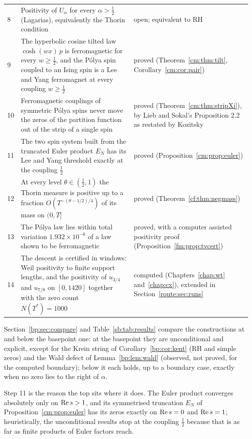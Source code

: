 \begin{longtable}{p{}p{}p{}}
8 & Positivity of $U_\alpha$ for every $\alpha>\frac12$ (Lagarias), equivalently the Thorin condition & open; equivalent to RH\\
9 & The hyperbolic cosine tilted law $\cosh(wx)\,p$ is ferromagnetic for every $w\ge\frac12$, and the P\'olya spin coupled to an Ising spin is a Lee and Yang ferromagnet at every coupling $w\ge\frac12$ & proved (Theorem~\ref{cm:thm:tilt}, Corollary~\ref{cm:cor:pair})\\
10 & Ferromagnetic couplings of symmetric P\'olya spins never move the zeros of the partition function out of the strip of a single spin & proved (Theorem~\ref{cm:thm:stripXi}), by Lieb and Sokal's Proposition 2.2 as restated by Kozitsky\\
11 & The two spin system built from the truncated Euler product $E_N$ has its Lee and Yang threshold exactly at the coupling $\frac12$ & proved (Proposition~\ref{cm:prop:euler})\\
12 & At every level $\theta\in(\frac12,1)$ the Thorin measure is positive up to a fraction $O(T^{-(\theta-1/2)/4})$ of its mass on $(0,T]$ & proved (Theorem~\ref{cf:thm:negmass})\\
13 & The P\'olya law lies within total variation $1.932\times10^{-6}$ of a law shown to be ferromagnetic & proved, with a computer assisted positivity proof (Proposition~\ref{fm:prop:tvcert})\\
14 & The descent is certified in windows: Weil positivity to finite support lengths, and the positivity of $u_{3/4}$ and $u_{7/8}$ on $[0,1420]$ together with the zero count $N(T^*)=1000$ & computed (Chapters~\ref{chap:wt} and~\ref{chap:cx}), extended in Section~\ref{route:sec:runs}\\
\bottomrule
\end{longtable}

Section~\ref{bp:sec:compare} and Table~\ref{sb:tab:results} compare the constructions at and below the basepoint one: at the basepoint they are unconditional and explicit, except for the Krein string of Corollary~\ref{bp:cor:kent} (RH and simple zeros) and the Wald defect of Lemma~\ref{bp:lem:wald} (observed, not proved, for the computed boundary); below it each holds, up to a boundary case, exactly when no zero lies to the right of $\alpha$.

Step 11 is the reason the top sits where it does. The Euler product converges absolutely only on $\operatorname{Re} s>1$, and its symmetrised truncation $E_N$ of Proposition~\ref{cm:prop:euler} has its zeros exactly on $\operatorname{Re} s=0$ and $\operatorname{Re} s=1$; heuristically, the unconditional results stop at the coupling $\frac12$ because that is as far as finite products of Euler factors reach.

